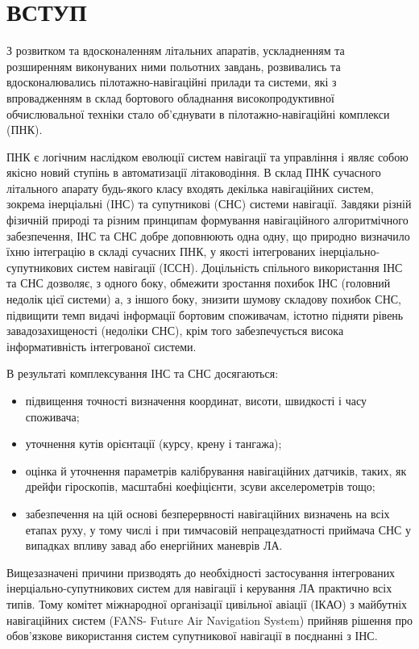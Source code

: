 \section*{ВСТУП}

З розвитком та вдосконаленням літальних апаратів, ускладненням та розширенням 
виконуваних ними польотних завдань, розвивались та вдосконалювались пілотажно-навігаційні 
прилади та системи, які з впровадженням в склад бортового обладнання високопродуктивної 
обчислювальної техніки стало об’єднувати в пілотажно-навігаційні комплекси (ПНК).

ПНК є логічним наслідком еволюції систем навігації та управління і являє собою якісно 
новий ступінь в автоматизації літаководіння. В склад ПНК сучасного літального апарату 
будь-якого класу входять декілька навігаційних систем, зокрема інерціальні 
(ІНС) та супутникові (СНС) системи навігації. Завдяки різній фізичній природі 
та різним принципам формування навігаційного алгоритмічного забезпечення,  ІНС 
та СНС добре доповнюють одна одну, що природно визначило їхню інтеграцію в 
складі сучасних ПНК, у якості  інтегрованих інерціально-супутникових систем 
навігації (ІССН). Доцільність спільного використання ІНС та СНС дозволяє, з 
одного боку, обмежити зростання похибок ІНС (головний недолік цієї системи) а, 
з іншого боку, знизити шумову складову похибок СНС, підвищити темп видачі 
інформації бортовим споживачам, істотно підняти рівень завадозахищеності (недоліки СНС), 
крім того забезпечується висока інформативність інтегрованої системи. 

В результаті комплексування ІНС та СНС досягаються:
\begin{itemize}
 \item підвищення точності визначення координат, висоти, швидкості і часу споживача;
 \item уточнення кутів орієнтації (курсу, крену і тангажа); 
 \item оцінка й уточнення параметрів калібрування навігаційних датчиків, таких, як 
дрейфи гіроскопів, масштабні коефіцієнти, зсуви акселерометрів тощо;
 \item забезпечення на цій основі безперервності навігаційних визначень на 
всіх етапах руху, у тому числі і при тимчасовій непрацездатності приймача СНС у 
випадках впливу  завад або енергійних маневрів ЛА.
\end{itemize}
Вищезазначені причини призводять до необхідності застосування інтегрованих 
інерціально-супутникових систем для навігації і керування ЛА практично всіх типів. 
Тому комітет міжнародної організації цивільної авіації (ІКАО) з майбутніх навігаційних 
систем (FANS- Future Air Navigation System) прийняв рішення про обов'язкове використання 
систем супутникової навігації в поєднанні з ІНС.

